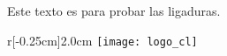 

Este texto es para probar las ligaduras.

\begin{wrapfigure}[5]{r}[-0.25cm]{2.0cm}
	\vspace{-0.5\baselineskip}
	\texttt{[image: logo\_cl]}
\end{wrapfigure}

\Blindtext


